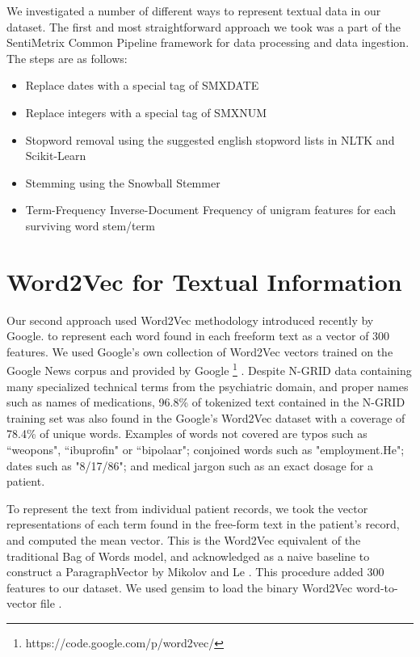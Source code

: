 We investigated a number of different ways to represent textual data in our dataset. The first and most straightforward approach we took was a part of the SentiMetrix Common Pipeline framework for data processing and data ingestion. The steps are as follows: 
 
 
 \begin{itemize}
     \item Replace dates with a special tag of \textsf{SMXDATE}
     \item Replace integers with a special tag of \textsf{SMXNUM}
     \item Stopword removal using the suggested english stopword lists in NLTK \cite{nltk} and Scikit-Learn \cite{scikit-learn}
     \item Stemming using the Snowball Stemmer \cite{snowball}
     
     \item Term-Frequency Inverse-Document Frequency \cite{ir-textbook,tf-idf} of unigram features for each surviving word stem/term
     
\end{itemize}

 
 \section{Word2Vec for Textual Information} \label{sec:word2vec-for-textual-info} Our second approach used
 \textsf{Word2Vec} 
 methodology \cite{word2vec} introduced
 recently by Google.
to represent each word found in each freeform text as a vector of 300 features.
We used Google's own collection of Word2Vec vectors trained on the Google News
corpus and provided by Google \footnote{https://code.google.com/p/word2vec/} . Despite N-GRID data containing many
specialized technical terms from the psychiatric domain, and proper names such as
names of medications, 96.8\% of tokenized text contained in the N-GRID training set
was also found in the Google's \textsf{Word2Vec} dataset with a coverage of 78.4\% of unique words. Examples of
words not covered are typos such as \textsf{``weopons"}, \textsf{``ibuprofin"} or \textsf{``bipolaar"}; conjoined words such as \textsf{"employment.He"}; dates such as \textsf{"8/17/86"}; and medical jargon such as an exact dosage for a patient.

To represent the text from individual patient records, we took the vector
representations of each term found in the free-form text in the patient's record,
and computed the mean vector. This is the Word2Vec 
equivalent of the traditional Bag of Words model, and acknowledged as a naive baseline to construct a
\textsf{ParagraphVector} by Mikolov and Le \cite{doc2vec}.  This procedure added 300 features to our dataset. We used gensim to load the binary Word2Vec word-to-vector file \cite{gensim}. 
 
